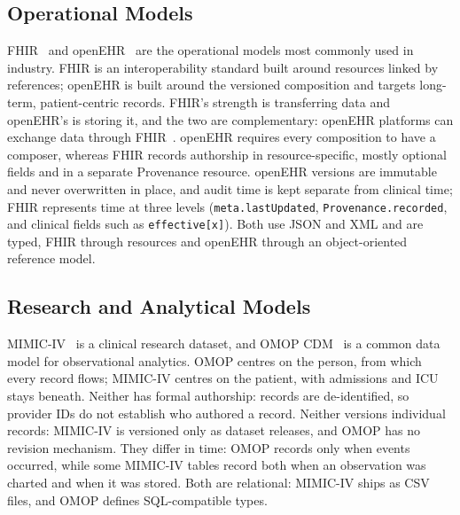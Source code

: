 \documentclass[sigconf]{acmart}
\begin{document}
\subsection{Operational Models}
FHIR~\cite{fhir-r4} and openEHR~\cite{openehr-rm} are the operational models
most commonly used in industry. FHIR is an interoperability standard built
around resources linked by references; openEHR is built around the versioned
composition and targets long-term, patient-centric records. FHIR's strength is
transferring data and openEHR's is storing it, and the two are complementary:
openEHR platforms can exchange data through FHIR~\cite{fhirconnect}. openEHR
requires every composition to have a composer, whereas FHIR records authorship
in resource-specific, mostly optional fields and in a separate Provenance
resource. openEHR versions are immutable and never overwritten in place, and
audit time is kept separate from clinical time; FHIR represents time at three
levels (\texttt{meta.lastUpdated}, \texttt{Provenance.recorded}, and clinical
fields such as \texttt{effective[x]}). Both use JSON and XML and are typed,
FHIR through resources and openEHR through an object-oriented reference model.

\subsection{Research and Analytical Models}
MIMIC-IV~\cite{mimic-iv} is a clinical research dataset, and
OMOP CDM~\cite{omop-cdm} is a common data model for observational analytics.
OMOP centres on the person, from which every record flows; MIMIC-IV centres on
the patient, with admissions and ICU stays beneath. Neither has formal
authorship: records are de-identified, so provider IDs do not establish who
authored a record. Neither versions individual records: MIMIC-IV is versioned
only as dataset releases, and OMOP has no revision mechanism. They differ in
time: OMOP records only when events occurred, while some MIMIC-IV tables record
both when an observation was charted and when it was stored. Both are
relational: MIMIC-IV ships as CSV files, and OMOP defines SQL-compatible types.
\end{document}
